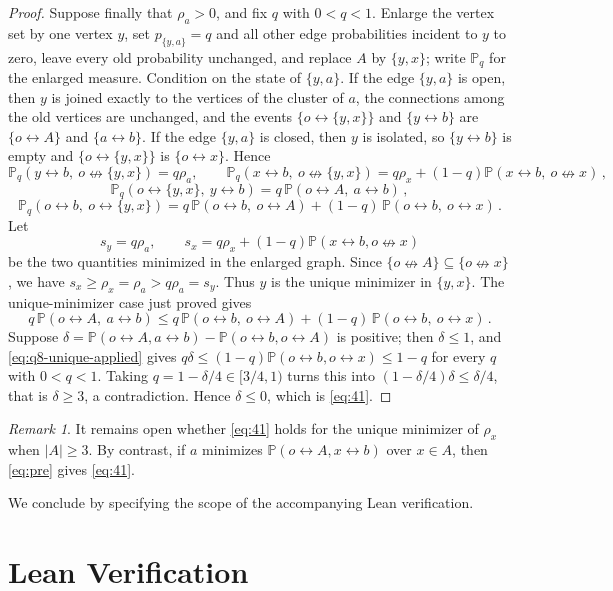 \documentclass[11pt]{article}
\theoremstyle{definition}
\theoremstyle{remark}
\newtheorem{remark}[theorem]{Remark}
\newcommand{\PP}{\mathbb P}
\newcommand{\con}{\leftrightarrow}
\newcommand{\ncon}{\nleftrightarrow}
\begin{document}
\begin{proof}
Suppose finally that $\rho_a>0$, and fix $q$ with $0<q<1$. Enlarge the vertex set by one
vertex $y$, set $p_{\{y,a\}}=q$ and all other edge probabilities incident to $y$ to zero,
leave every old probability unchanged, and replace $A$ by $\{y,x\}$; write $\PP_q$ for the
enlarged measure. Condition on the state of $\{y,a\}$. If the edge $\{y,a\}$ is open, then $y$ is
joined exactly to the vertices of the cluster of $a$, the connections among the old
vertices are unchanged, and the events $\{o\con\{y,x\}\}$ and $\{y\con b\}$ are $\{o\con
A\}$ and $\{a\con b\}$. If the edge $\{y,a\}$ is closed, then $y$ is isolated, so $\{y\con b\}$ is empty
and $\{o\con\{y,x\}\}$ is $\{o\con x\}$. Hence
\[
 \PP_q(y\con b,\ o\ncon\{y,x\})=q\rho_a,\qquad
 \PP_q(x\con b,\ o\ncon\{y,x\})=q\rho_x+(1-q)\PP(x\con b,\ o\ncon x)\,,
\]
\[
 \PP_q(o\con\{y,x\},\ y\con b)=q\,\PP(o\con A,\ a\con b)\,,
\]
\[
 \PP_q(o\con b,\ o\con\{y,x\})=q\,\PP(o\con b,\ o\con A)+(1-q)\,\PP(o\con b,\ o\con x)\,.
\]
Let
\[
 s_y=q\rho_a,\qquad
 s_x=q\rho_x+(1-q)\PP(x\con b,o\ncon x)
\]
be the two quantities minimized in the enlarged graph. Since
$\{o\ncon A\}\subseteq\{o\ncon x\}$, we have
$s_x\geq\rho_x=\rho_a>q\rho_a=s_y$. Thus $y$ is the unique minimizer in $\{y,x\}$.
The unique-minimizer case just proved gives
\begin{equation}\label{eq:q8-unique-applied}
 q\,\PP(o\con A,\ a\con b)\leq q\,\PP(o\con b,\ o\con A)+(1-q)\,\PP(o\con b,\ o\con x)\,.
\end{equation}
Suppose $\delta=\PP(o\con A,a\con b)-\PP(o\con b,o\con A)$ is positive; then $\delta\le1$,
and \eqref{eq:q8-unique-applied} gives
$q\delta\le(1-q)\PP(o\con b,o\con x)\le1-q$ for every $q$ with $0<q<1$. Taking
$q=1-\delta/4\in[3/4,1)$ turns this into
$(1-\delta/4)\delta\le\delta/4$, that is $\delta\ge3$, a contradiction. Hence $\delta\le0$,
which is \eqref{eq:41}.
\end{proof}

\begin{remark}
It remains open whether \eqref{eq:41} holds for the unique minimizer of $\rho_x$ when
$|A|\geq3$. By contrast, if $a$ minimizes $\PP(o\con A,x\con b)$ over $x\in A$, then
\eqref{eq:pre} gives \eqref{eq:41}.
\end{remark}

We conclude by specifying the scope of the accompanying Lean verification.

\section{Lean Verification}\label{sec:lean}
\end{document}
